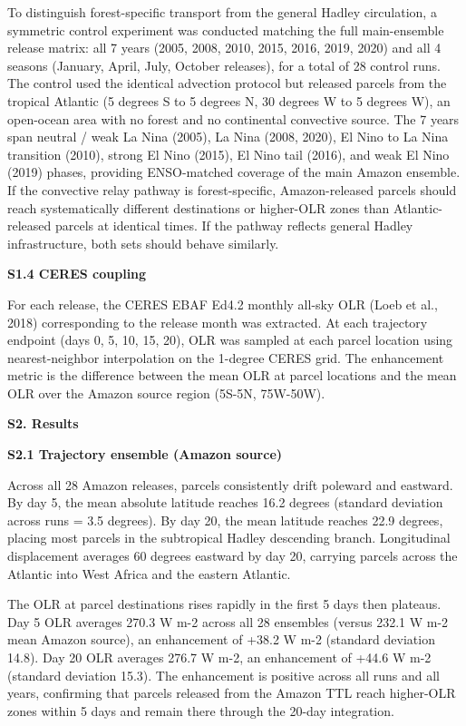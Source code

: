 To distinguish forest-specific transport from the general Hadley
circulation, a symmetric control experiment was conducted matching the
full main-ensemble release matrix: all 7 years (2005, 2008, 2010, 2015,
2016, 2019, 2020) and all 4 seasons (January, April, July, October
releases), for a total of 28 control runs. The control used the
identical advection protocol but released parcels from the tropical
Atlantic (5 degrees S to 5 degrees N, 30 degrees W to 5 degrees W), an
open-ocean area with no forest and no continental convective source.
The 7 years span neutral / weak La Nina (2005), La Nina (2008, 2020),
El Nino to La Nina transition (2010), strong El Nino (2015), El Nino
tail (2016), and weak El Nino (2019) phases, providing ENSO-matched
coverage of the main Amazon ensemble. If the convective relay pathway
is forest-specific, Amazon-released parcels should reach systematically
different destinations or higher-OLR zones than Atlantic-released
parcels at identical times. If the pathway reflects general Hadley
infrastructure, both sets should behave similarly.

\textbf{S1.4 CERES coupling}

For each release, the CERES EBAF Ed4.2 monthly all-sky OLR (Loeb et al.,
2018) corresponding to the release month was extracted. At each
trajectory endpoint (days 0, 5, 10, 15, 20), OLR was sampled at each
parcel location using nearest-neighbor interpolation on the 1-degree
CERES grid. The enhancement metric is the difference between the mean
OLR at parcel locations and the mean OLR over the Amazon source region
(5S-5N, 75W-50W).

\textbf{S2. Results}

\textbf{S2.1 Trajectory ensemble (Amazon source)}

Across all 28 Amazon releases, parcels consistently drift poleward and
eastward. By day 5, the mean absolute latitude reaches 16.2 degrees
(standard deviation across runs = 3.5 degrees). By day 20, the mean
latitude reaches 22.9 degrees, placing most parcels in the subtropical
Hadley descending branch. Longitudinal displacement averages 60 degrees
eastward by day 20, carrying parcels across the Atlantic into West
Africa and the eastern Atlantic.

The OLR at parcel destinations rises rapidly in the first 5 days then
plateaus. Day 5 OLR averages 270.3 W m-2 across all 28 ensembles (versus
232.1 W m-2 mean Amazon source), an enhancement of +38.2 W m-2 (standard
deviation 14.8). Day 20 OLR averages 276.7 W m-2, an enhancement of
+44.6 W m-2 (standard deviation 15.3). The enhancement is positive
across all runs and all years, confirming that parcels released from the
Amazon TTL reach higher-OLR zones within 5 days and remain there through
the 20-day integration.

